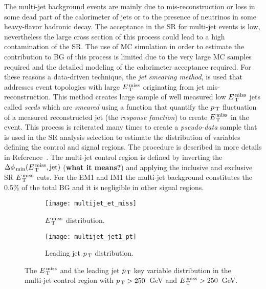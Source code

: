 The multi-jet background events are mainly due to mis-reconstruction or loss in
some dead part of the calorimeter of jets or to the presence of neutrinos in
some heavy-flavor hadronic decay. The acceptance in the SR for multi-jet events
is low, nevertheless the large cross section of this process could lead to a
high contamination of the SR\@. The use of MC simulation in order to estimate
the contribution to BG of this process is limited due to the very large MC
samples required and the detailed modeling of the calorimeter acceptance
required. For these reasons a data-driven technique, the \emph{jet smearing
  method}, is used that addresses event topologies with large $E_\mathrm{\, T}^\mathrm{\, miss}$ originating
from jet mis-reconstruction. This method creates large sample of well measured
low $E_\mathrm{\, T}^\mathrm{\, miss}$ jets called \emph{seeds} which are \emph{smeared} using a function
that quantify the $p_\mathrm{\, T}$ fluctuation of a measured reconstructed jet (the
\emph{response function}) to create $E_\mathrm{\, T}^\mathrm{\, miss}$ in the event. This process is
reiterated many times to create a \emph{pseudo-data} sample that is used in the
SR analysis selection to estimate the distribution of variables defining the
control and signal regions. The procedure is described in more details in
Reference~\cite{JetSmearing}. The multi-jet control region is defined by
inverting the $\Delta \phi_\mathrm{\, min} (E_\mathrm{\, T}^\mathrm{\, miss}, \mathrm{jet})$ (\textbf{what
  it means?}) and applying the inclusive and exclusive SR $E_\mathrm{\, T}^\mathrm{\, miss}$ cuts. For the
EM1 and IM1 the multi-jet background constitutes the 0.5\% of the total BG and
it is negligible in other signal regions.

\begin{figure}[!h]
  \centering
  \begin{subfigure}[t]{.48\linewidth}
    \texttt{[image: multijet\_et\_miss]}
    \caption{$E_\mathrm{\, T}^\mathrm{\, miss}$ distribution.}
    \label{fig:dimuon_cr_et_miss_pre_fit}
  \end{subfigure}
  \begin{subfigure}[t]{.48\linewidth}
    \texttt{[image: multijet\_jet1\_pt]}
    \caption{Leading jet $p_\mathrm{\, T}$ distribution.}
    \label{fig:dimuon_cr_jet1_pt_pre_fit}
  \end{subfigure}
  \caption{The $E_\mathrm{\, T}^\mathrm{\, miss}$ and the leading jet $p_\mathrm{\, T}$ key variable distribution in the
    multi-jet control region with $p_\mathrm{\, T} > 250$~GeV and $E_\mathrm{\, T}^\mathrm{\, miss} > 250$~GeV.}
  \label{fig:multijet_distributions}
\end{figure}
